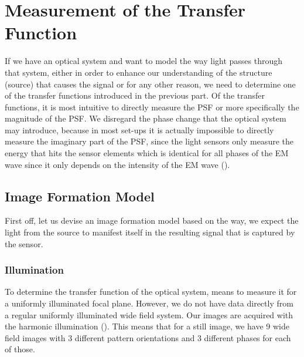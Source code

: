 \setchapterpreamble[u]{\margintoc}
\chapter{Measurement of the Transfer Function}

If we have an optical system and want to model the way light passes through that system, either in order to enhance our
    understanding of the structure (source) that causes the signal or for any other reason, we need to determine one of
    the transfer functions introduced in the previous part. %
Of the transfer functions, it is most intuitive to directly measure the \ac{PSF} or more specifically the
    magnitude of the \ac{PSF}.
We disregard the phase change that the optical system may introduce, because in most set-ups it is actually impossible 
    to directly measure the imaginary part of the \ac{PSF}, since the light sensors only measure 
    the energy that hits the sensor elements which is identical for all phases of the \ac{EM} wave since it only depends 
    on the intensity of the \ac{EM} wave (). %


\section{Image Formation Model}%

First off, let us devise an image formation model based on the way, we expect the light from the source to manifest 
    itself in the resulting signal that is captured by the sensor.


\subsection{Illumination}%
To determine the transfer function of the optical system, means to measure it for a uniformly illuminated focal plane.
However, we do not have data directly from a regular uniformly illuminated wide field system.
Our images are acquired with the harmonic illumination (). 
This means that for a still image, we have 9 wide field images with 3 different 
    pattern orientations and 3 different phases for each of those.

